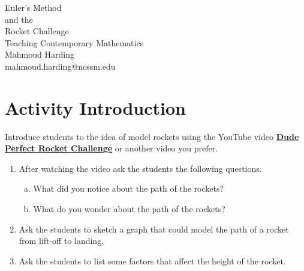 \documentclass [12pt, letterpaper, titlepage] {article}
\begin{document}
\begin{titlepage}
\vspace*{3cm}
	\begin{center}
		\Huge {Euler's Method \\ and the \\ Rocket Challenge \\ \vspace{1cm} Teaching Contemporary Mathematics \\ \vspace{1cm}}
		\Large {Mahmoud Harding \\ mahmoud.harding@ncssm.edu \vspace{1cm}}
	\end{center}
\end{titlepage}
\section*{Activity Introduction}
Introduce students to the idea of model rockets using the YouTube video \href{https://youtu.be/WpqUOW19aJQ}{\textbf{Dude Perfect Rocket Challenge}} or another video you prefer.
\begin{enumerate}
	\item{After watching the video ask the students the following questions.}
		\begin{enumerate}[a.]
			\item{What did you notice about the path of the rockets?}
			\item{What do you wonder about the path of the rockets?}
		\end{enumerate}
	\item{Ask the students to sketch a graph that could model the path of a rocket from lift-off to landing.}
	\item{Ask the students to list some factors that affect the height of the rocket.}
\end{enumerate}
\end{document}
